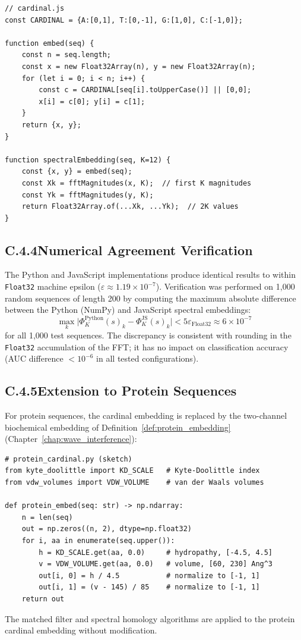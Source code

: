 \begin{verbatim}
// cardinal.js
const CARDINAL = {A:[0,1], T:[0,-1], G:[1,0], C:[-1,0]};

function embed(seq) {
    const n = seq.length;
    const x = new Float32Array(n), y = new Float32Array(n);
    for (let i = 0; i < n; i++) {
        const c = CARDINAL[seq[i].toUpperCase()] || [0,0];
        x[i] = c[0]; y[i] = c[1];
    }
    return {x, y};
}

function spectralEmbedding(seq, K=12) {
    const {x, y} = embed(seq);
    const Xk = fftMagnitudes(x, K);  // first K magnitudes
    const Yk = fftMagnitudes(y, K);
    return Float32Array.of(...Xk, ...Yk);  // 2K values
}
\end{verbatim}

\subsection*{C.4.4\quad Numerical Agreement Verification}

The Python and JavaScript implementations produce identical results to within
\texttt{Float32} machine epsilon ($\varepsilon \approx 1.19 \times 10^{-7}$).
Verification was performed on 1,000 random sequences of length 200 by computing
the maximum absolute difference between the Python (NumPy) and JavaScript
spectral embeddings:
\[
  \max_k \bigl| \Phi_K^{\mathrm{Python}}(s)_k - \Phi_K^{\mathrm{JS}}(s)_k \bigr|
  < 5\varepsilon_{\mathrm{Float32}} \approx 6 \times 10^{-7}
\]
for all 1,000 test sequences. The discrepancy is consistent with rounding in
the \texttt{Float32} accumulation of the FFT; it has no impact on classification
accuracy (AUC difference $< 10^{-6}$ in all tested configurations).

\subsection*{C.4.5\quad Extension to Protein Sequences}

For protein sequences, the cardinal embedding is replaced by the two-channel
biochemical embedding of Definition~\ref{def:protein_embedding}
(Chapter~\ref{chap:wave_interference}):

\begin{verbatim}
# protein_cardinal.py (sketch)
from kyte_doolittle import KD_SCALE   # Kyte-Doolittle index
from vdw_volumes import VDW_VOLUME    # van der Waals volumes

def protein_embed(seq: str) -> np.ndarray:
    n = len(seq)
    out = np.zeros((n, 2), dtype=np.float32)
    for i, aa in enumerate(seq.upper()):
        h = KD_SCALE.get(aa, 0.0)     # hydropathy, [-4.5, 4.5]
        v = VDW_VOLUME.get(aa, 0.0)   # volume, [60, 230] Ang^3
        out[i, 0] = h / 4.5           # normalize to [-1, 1]
        out[i, 1] = (v - 145) / 85    # normalize to [-1, 1]
    return out
\end{verbatim}

The matched filter and spectral homology algorithms are applied to the
protein cardinal embedding without modification.
